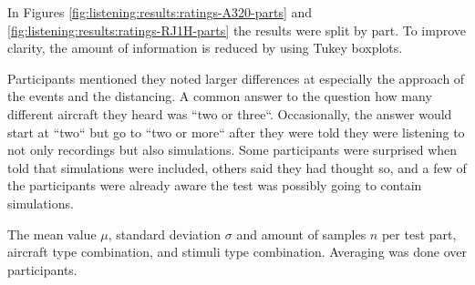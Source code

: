 In Figures \ref{fig:listening:results:ratings-A320-parts} and
\ref{fig:listening:results:ratings-RJ1H-parts} the results were split by part.
To improve clarity, the amount of information is reduced by using Tukey boxplots.

Participants mentioned they noted larger differences at especially the approach of the events and the distancing.
A common answer to the question how many different aircraft they heard was ``two or three``.
Occasionally, the answer would start at ``two`` but go to ``two or more`` after they
were told they were listening to not only recordings but also simulations. Some
participants were surprised when told that simulations were included,
others said they had thought so, and a few of the participants were already
aware the test was possibly going to contain simulations.

\begin{table}[H]
  \centering
  \caption{The mean value $\mu$, standard deviation $\sigma$ and amount of samples $n$ per test part, aircraft type combination, and stimuli type combination. Averaging was done over participants.}
  \label{table:listening:results:analysis-parts}
  
\end{table}



